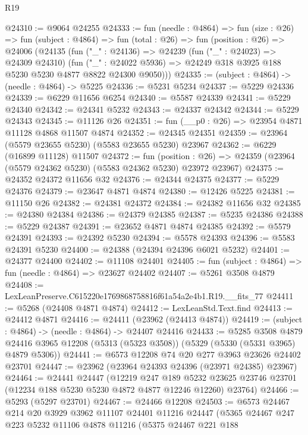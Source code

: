 \begin{lexlean}{R19}
\begin{coremodule}
@24310 := @9064 @24255
@24333 := fun (needle : @4864) =>
  fun (size : @26) =>
  fun (subject : @4864) =>
  fun (total : @26) =>
  fun (position : @26) =>
  @24006
    (@24135
      (fun ("_" : @24136) =>
      @24239
        (fun ("_" : @24023) => @24309 @24310)
        (fun ("_" : @24022 @5936) => @24249 @318 @3925 @188 @5230 @5230 @4877 @8822 @24300 @9050)))
@24335 := (subject : @4864) -> (needle : @4864) -> @5225
@24336 := @5231 @5234
@24337 := @5229 @24336
@24339 := @6229 @11656 @6254
@24340 := @5587 @24339
@24341 := @5229 @24340
@24342 := @24341 @5232
@24343 := @24337 @24342
@24344 := @5229 @24343
@24345 := @11126 @26
@24351 := fun (__p0 : @26) => @23954 @4871 @11128 @4868 @11507 @4874
@24352 := @24345 @24351
@24359 := @23964 (@5579 @23655 @5230) (@5583 @23655 @5230) @23967
@24362 := @6229 (@16899 @11128) @11507
@24372 := fun (position : @26) =>
  @24359 (@23964 (@5579 @24362 @5230) (@5583 @24362 @5230) @23972 @23967)
@24375 := @24352 @24372 @11656 @32
@24376 := @24344 @24375
@24377 := @5229 @24376
@24379 := @23647 @4871 @4874
@24380 := @12426 @5225
@24381 := @11150 @26
@24382 := @24381 @24372
@24384 := @24382 @11656 @32
@24385 := @24380 @24384
@24386 := @24379 @24385
@24387 := @5235 @24386
@24388 := @5229 @24387
@24391 := @23652 @4871 @4874 @24385
@24392 := @5579 @24391
@24393 := @24392 @5230
@24394 := @5578 @24393
@24396 := @5583 @24391 @5230
@24400 := @24388 (@24394 @24396 @6021 @5232)
@24401 := @24377 @24400
@24402 := @11108 @24401
@24405 := fun (subject : @4864) => fun (needle : @4864) => @23627 @24402
@24407 := @5261 @3508 @4879
@24408 := LexLeanPreserve.C615220e1769868758816f61a54a2e4b1.R19.__fits_77
@24411 := @5268 (@24408 @4871 @4874)
@24412 := LexLeanStd.Text.find
@24413 := @24412 @4871
@24416 := @24411 (@23962 (@24413 @4874))
@24419 := (subject : @4864) -> (needle : @4864) -> @24407 @24416
@24433 := @5285
    @3508
    @4879
    @24416
    @3965
    @12208
    (@5313 (@5323 @3508))
    (@5329 (@5330 (@5331 @3965) @4879 @5306))
@24441 := @6573 @12208 @74 @20 @277 @3963 @23626 @24402 @23701
@24447 := @23962 (@23964 @24393 @24396 (@23971 @24385) @23967)
@24464 := @24441
    @24447
    (@12219
      @247
      @189
      @5232
      @23625
      @23746
      @23701
      (@12234 @188 @5230 @5230 @4872 @4877 @12246 @12260)
      @23764)
@24466 := @5293 (@5297 @23701)
@24467 := @24466 @12208
@24503 := @6573
    @24467
    @214
    @20
    @3929
    @3962
    @11107
    @24401
    @11216
    @24447
    (@5365
      @24467
      @247
      @223
      @5232
      @11106
      @4878
      @11216
      (@5375
        @24467
        @221
        @188

\end{coremodule}
\end{lexlean}
